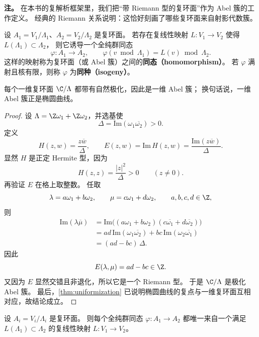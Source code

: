 \textbf{注。}
在本书的复解析框架里，我们把“带 Riemann 型的复环面”作为 Abel 簇的工作定义。
经典的 Riemann 关系说明：这恰好刻画了哪些复环面来自射影代数簇。

\begin{definition}[同态与同种]
\label{def:abelian-hom-isogeny}
设 $A_1=V_1/\Lambda_1$、$A_2=V_2/\Lambda_2$ 是复环面。
若存在复线性映射 $L:V_1\to V_2$ 使得 $L(\Lambda_1)\subset \Lambda_2$，
则它诱导一个全纯群同态
\[
  \varphi:A_1\to A_2,
  \qquad
  \varphi(v\bmod \Lambda_1)=L(v)\bmod \Lambda_2.
\]
这样的映射称为复环面（或 Abel 簇）之间的\textbf{同态（homomorphism）}。
若 $\varphi$ 满射且核有限，则称 $\varphi$ 为\textbf{同种（isogeny）}。
\end{definition}

\begin{proposition}[一维复环面自动极化]
\label{prop:dim1-torus-abelian}
每个一维复环面 $\C/\Lambda$ 都带有自然极化，因此是一维 Abel 簇；
换句话说，一维 Abel 簇正是椭圆曲线。
\end{proposition}

\begin{proof}
设 $\Lambda=\Z\omega_1+\Z\omega_2$，并选基使
\[
  \Delta=\mathrm{Im}(\omega_1\overline{\omega_2})>0.
\]
定义
\[
  H(z,w)=\frac{z\overline{w}}{\Delta},
  \qquad
  E(z,w)=\mathrm{Im}\,H(z,w)=\frac{\mathrm{Im}(z\overline{w})}{\Delta}.
\]
显然 $H$ 是正定 Hermite 型，因为
\[
  H(z,z)=\frac{|z|^2}{\Delta}>0 \qquad (z\neq 0).
\]
再验证 $E$ 在格上取整数。
任取
\[
  \lambda=a\omega_1+b\omega_2,
  \qquad
  \mu=c\omega_1+d\omega_2,
  \qquad a,b,c,d\in\Z,
\]
则
\begin{align*}
  \mathrm{Im}(\lambda\overline{\mu})
  &=\mathrm{Im}\bigl((a\omega_1+b\omega_2)(c\overline{\omega_1}+d\overline{\omega_2})\bigr) \\
  &=ad\,\mathrm{Im}(\omega_1\overline{\omega_2})
    +bc\,\mathrm{Im}(\omega_2\overline{\omega_1}) \\
  &=(ad-bc)\,\Delta.
\end{align*}
因此
\[
  E(\lambda,\mu)=ad-bc\in\Z.
\]
又因为 $E$ 显然交错且非退化，所以它是一个 Riemann 型。
于是 $\C/\Lambda$ 是极化 Abel 簇。
最后，\cref{thm:uniformization} 已说明椭圆曲线的复点与一维复环面互相对应，故结论成立。
\end{proof}

\begin{proposition}[同态的线性刻画]
\label{prop:hom-linear-lift}
设 $A_i=V_i/\Lambda_i$ 是复环面。
则每个全纯群同态 $\varphi:A_1\to A_2$ 都唯一来自一个满足
$L(\Lambda_1)\subset \Lambda_2$ 的复线性映射 $L:V_1\to V_2$。
\end{proposition}

